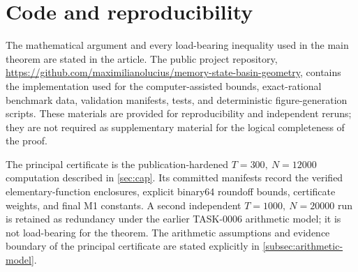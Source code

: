 \section*{Code and reproducibility}

The mathematical argument and every load-bearing inequality used in the main theorem are stated in the article. The public project repository, \url{https://github.com/maximilianolucius/memory-state-basin-geometry}, contains the implementation used for the computer-assisted bounds, exact-rational benchmark data, validation manifests, tests, and deterministic figure-generation scripts. These materials are provided for reproducibility and independent reruns; they are not required as supplementary material for the logical completeness of the proof.

The principal certificate is the publication-hardened \(T=300,\ N=12000\) computation described in \cref{sec:cap}. Its committed manifests record the verified elementary-function enclosures, explicit binary64 roundoff bounds, certificate weights, and final M1 constants. A second independent \(T=1000,\ N=20000\) run is retained as redundancy under the earlier TASK-0006 arithmetic model; it is not load-bearing for the theorem. The arithmetic assumptions and evidence boundary of the principal certificate are stated explicitly in \cref{subsec:arithmetic-model}.
